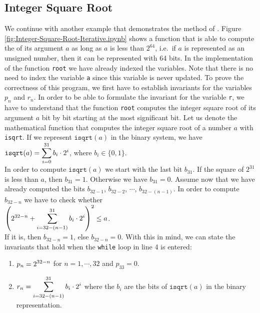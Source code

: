 \subsection{Integer Square Root}
We continue with another example that demonstrates the method of .
Figure \ref{fig:Integer-Square-Root-Iterative.ipynb} shows a function that is able to compute the
 of its argument $a$ as long as $a$ is less than $2^{64}$, i.e.~if $a$ is represented as an unsigned
number, then it can be represented with 64 bits.  In the implementation of the function \texttt{root} we have
already indexed the variables.  Note that there is no 
need to index the variable \texttt{a} since this variable is never updated.  To prove the correctness of this
program, we first 
have to establish invariants for the variables $p_n$ and $r_n$.  In order to be able to formulate the invariant
for the variable \texttt{r}, we have to understand that the function \texttt{root} computes the integer square
root of its argument $a$ bit by bit starting at the most significant bit.  Let us denote the
mathematical function that computes the integer square root of a number $a$ with \texttt{isqrt}.  If we
represent $\mathtt{isqrt}(a)$ in the binary system, we have
\\[0.2cm]
\hspace*{1.3cm}
$\displaystyle \mathtt{isqrt}(a) = \sum\limits_{i=0}^{31} b_i \cdot 2^i$, \quad where $b_i \in \{0,1\}$.
\\[0.2cm]
In order to compute $\mathtt{isqrt}(a)$ we start with the last bit $b_{31}$.  If the square of $2^{31}$ is less
than $a$, then $b_{31} = 1$.  Otherwise we have $b_{31} = 0$.  Assume now that we have already computed the
bits $b_{32-1}$, $b_{32-2}$, $\cdots$, $b_{32-(n-1)}$.  In order to compute $b_{32-n}$ we have to check whether
\\[0.2cm]
\hspace*{1.3cm}
$\displaystyle\left(\displaystyle 2^{32-n} + \sum\limits_{i=32-(n-1)}^{31} b_i \cdot 2^i \right)^2 \leq a$.
\\[0.2cm]
If it is, then  $b_{32-n} = 1$, else $b_{32-n} = 0$.
With this in mind, we can state the invariants that hold when the \texttt{while} loop in line 4 is entered:
\begin{enumerate}
\item $\displaystyle p_n = 2^{32 - n}$ \quad for $n=1,\cdots,32$ and $p_{33} = 0$.
\item $\displaystyle r_n = \sum\limits_{i=32-(n-1)}^{31} b_i \cdot 2^i$ \quad where the $b_i$ are the bits of
      $\mathtt{isqrt}(a)$ in the binary representation.
\end{enumerate}

